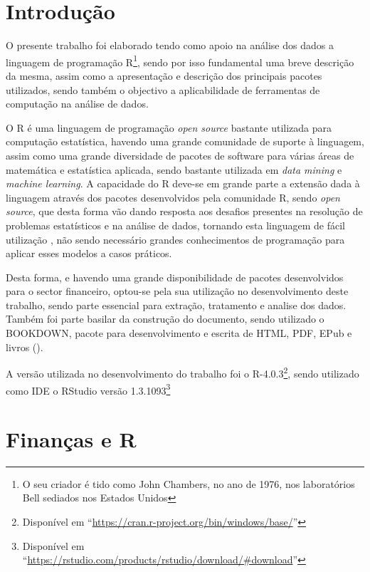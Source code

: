 \documentclass[
  12pt,
  a4paper,
  openany]{book}
\begin{document}
\hypertarget{introduuxe7uxe3o}{%
\section{Introdução}\label{introduuxe7uxe3o}}

O presente trabalho foi elaborado tendo como apoio na análise dos dados a linguagem de programação R\footnote{O seu criador é tido como John Chambers, no ano de 1976, nos laboratórios Bell sediados nos Estados Unidos}, sendo por isso fundamental uma breve descrição da mesma, assim como a apresentação e descrição dos principais pacotes utilizados, sendo também o objectivo a aplicabilidade de ferramentas de computação na análise de dados.

O R é uma linguagem de programação \emph{open source} bastante utilizada para computação estatística, havendo uma grande comunidade de suporte à linguagem, assim como uma grande diversidade de pacotes de software para várias áreas de matemática e estatística aplicada, sendo bastante utilizada em \emph{data mining} e \emph{machine learning}. A capacidade do R deve-se em grande parte a extensão dada à linguagem através dos pacotes desenvolvidos pela comunidade R, sendo \emph{open source}, que desta forma vão dando resposta aos desafios presentes na resolução de problemas estatísticos e na análise de dados, tornando esta linguagem de fácil utilização , não sendo necessário grandes conhecimentos de programação para aplicar esses modelos a casos práticos.

Desta forma, e havendo uma grande disponibilidade de pacotes desenvolvidos para o sector financeiro, optou-se pela sua utilização no desenvolvimento deste trabalho, sendo parte essencial para extração, tratamento e analise dos dados. Também foi parte basilar da construção do documento, sendo utilizado o BOOKDOWN, pacote para desenvolvimento e escrita de HTML, PDF, EPub e livros (\citet{R-bookdown}).

A versão utilizada no desenvolvimento do trabalho foi o R-4.0.3\footnote{Disponível em ``\url{https://cran.r-project.org/bin/windows/base/}''}, sendo utilizado como IDE o RStudio versão 1.3.1093\footnote{Disponível em ``\url{https://rstudio.com/products/rstudio/download/\#download}''}

\hypertarget{finanuxe7as-e-r}{%
\section{Finanças e R}\label{finanuxe7as-e-r}}
\end{document}
